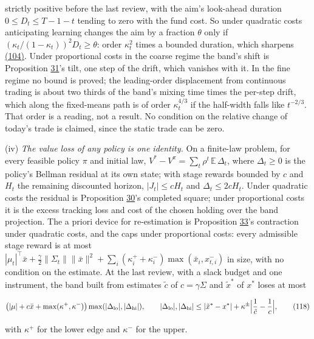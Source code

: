 \documentclass[11pt]{article}
\begin{document}
strictly positive before the last review, with the aim's look-ahead
duration \(0\leq D_t\leq T-1-t\) tending to zero with the fund cost. So
under quadratic costs anticipating learning changes the aim by a
fraction \(\theta\) only if \((\kappa_t/(1-\kappa_t))^2D_t\geq\theta\): order \(\kappa_t^2\) times a
bounded duration, which sharpens \hyperref[eq:104]{(104)}. Under proportional costs in the
coarse regime the band's shift is Proposition \hyperref[res:Proposition-31]{31}'s tilt, one step of
the drift, which vanishes with it. In the fine regime no bound is
proved; the leading-order displacement from continuous trading is
about two thirds of the band's mixing time times the per-step drift,
which along the fixed-means path is of order \(\kappa_t^{4/3}\) if the
half-width falls like \(t^{-2/3}\). That order is a reading, not a result.
No condition on the relative change of today's trade is claimed, since
the static trade can be zero.

(iv) \emph{The value loss of any policy is one identity.} On a finite-law
problem, for every feasible policy \(\pi\) and initial law,
\(V^*-V^\pi=\sum_t\rho^t\,\mathbb E\,\Delta_t\), where \(\Delta_t\geq0\) is the policy's Bellman
residual at its own state; with stage rewards bounded by \(c\) and \(H_t\)
the remaining discounted horizon, \(|J_t|\leq cH_t\) and \(\Delta_t\leq2cH_t\). Under
quadratic costs the residual is Proposition \hyperref[res:Proposition-30]{30}'s completed square;
under proportional costs it is the excess tracking loss and cost of
the chosen holding over the band projection. The a priori device for
re-estimation is Proposition \hyperref[res:Proposition-33]{33}'s contraction under quadratic costs,
and the caps under proportional costs: every admissible stage reward is
at most \(|\mu_t|^\top\bar x+\frac\gamma2\|\Sigma_t\|\|\bar x\|^2+\sum_i(\kappa^+_i+\kappa^-_i)\max(\bar x_i,x^-_{t,i})\) in size,
with no condition on the estimate. At the last review, with a slack
budget and one instrument, the band built from estimates \(\tilde c\) of
\(c=\gamma\Sigma\) and \(\tilde x^*\) of \(x^*\) loses at most

\begin{equation*}
\bigl(|\mu|+c\bar x+\max(\kappa^+,\kappa^-)\bigr)\max(|\Delta_{\rm lo}|,|\Delta_{\rm hi}|),\qquad
|\Delta_{\rm lo}|,|\Delta_{\rm hi}|\leq|\tilde x^*-x^*|+\kappa^\pm\Bigl|\frac1{\tilde c}-\frac1c\Bigr|,\tag{118}\label{eq:118}
\end{equation*}

with \(\kappa^+\) for the lower edge and \(\kappa^-\) for the upper.
\end{document}
